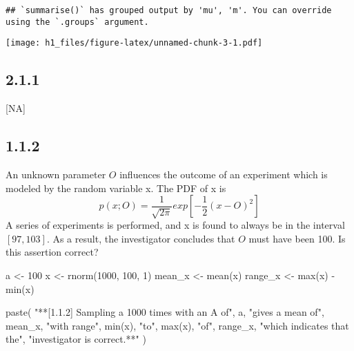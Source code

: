 \documentclass[
]{article}
\newenvironment{Shaded}{\begin{snugshade}}{\end{snugshade}}
\newcommand{\DecValTok}[1]{\textcolor[rgb]{0.00,0.00,0.81}{#1}}
\newcommand{\FunctionTok}[1]{\textcolor[rgb]{0.00,0.00,0.00}{#1}}
\newcommand{\NormalTok}[1]{#1}
\newcommand{\OtherTok}[1]{\textcolor[rgb]{0.56,0.35,0.01}{#1}}
\newcommand{\SpecialCharTok}[1]{\textcolor[rgb]{0.00,0.00,0.00}{#1}}
\newcommand{\StringTok}[1]{\textcolor[rgb]{0.31,0.60,0.02}{#1}}
\begin{document}
\begin{verbatim}
## `summarise()` has grouped output by 'mu', 'm'. You can override using the `.groups` argument.
\end{verbatim}

\texttt{[image: h1\_files/figure-latex/unnamed-chunk-3-1.pdf]}

\hypertarget{section-3}{%
\subsection{2.1.1}\label{section-3}}

{[}NA{]}

\hypertarget{section-4}{%
\subsection{1.1.2}\label{section-4}}

An unknown parameter \(O\) influences the outcome of an experiment which
is modeled by the random variable x. The PDF of x is
\[p(x;O)=\dfrac{1}{\sqrt{2\pi}}exp\left[-\dfrac{1}{2}(x-O)^2\right]\] A
series of experiments is performed, and x is found to always be in the
interval \([97,103]\). As a result, the investigator concludes that
\(O\) must have been 100. Is this assertion correct?

\begin{Shaded}
\begin{Highlighting}[]
\NormalTok{a }\OtherTok{\textless{}{-}} \DecValTok{100}
\NormalTok{x }\OtherTok{\textless{}{-}} \FunctionTok{rnorm}\NormalTok{(}\DecValTok{1000}\NormalTok{, }\DecValTok{100}\NormalTok{, }\DecValTok{1}\NormalTok{)}
\NormalTok{mean\_x }\OtherTok{\textless{}{-}} \FunctionTok{mean}\NormalTok{(x)}
\NormalTok{range\_x }\OtherTok{\textless{}{-}} \FunctionTok{max}\NormalTok{(x) }\SpecialCharTok{{-}} \FunctionTok{min}\NormalTok{(x)}

\FunctionTok{paste}\NormalTok{(}
  \StringTok{"**[1.1.2] Sampling a 1000 times with an A of"}\NormalTok{,}
\NormalTok{  a,}
  \StringTok{"gives a mean of"}\NormalTok{,}
\NormalTok{  mean\_x,}
  \StringTok{"with range"}\NormalTok{,}
  \FunctionTok{min}\NormalTok{(x),}
  \StringTok{"to"}\NormalTok{,}
  \FunctionTok{max}\NormalTok{(x),}
  \StringTok{"of"}\NormalTok{,}
\NormalTok{  range\_x,}
  \StringTok{"which indicates that the"}\NormalTok{,}
  \StringTok{"investigator is correct.**"}
\NormalTok{)}
\end{Highlighting}
\end{Shaded}
\end{document}
